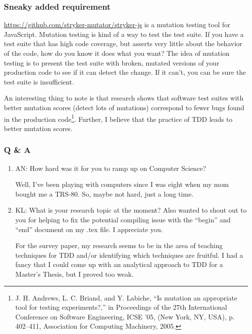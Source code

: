 \subsubsection{Sneaky added requirement}
\url{https://github.com/stryker-mutator/stryker-js} is a mutation testing tool for JavaScript.
Mutation testing is kind of a way to test the test suite.
If you have a test suite that has high code coverage, but asserts very little about the behavior of the code, how do you know it does what you want?
The idea of mutation testing is to present the test suite with broken, mutated versions of your production code to see if it can detect the change.
If it can't, you can be sure the test suite is insufficient.

An interesting thing to note is that research shows that software test suites with better mutation scores (detect lots of mutations) correspond to fewer bugs found in the production code\footnote{J. H. Andrews, L. C. Briand, and Y. Labiche, ``Is mutation an appropriate tool for testing experiments?,'' in Proceedings of the 27th International Conference on Software Engineering, ICSE ’05, (New York, NY, USA), p. 402–411, Association for Computing Machinery, 2005.}.
Further, I believe that the practice of TDD leads to better mutation scores.

\subsubsection{Q \& A}
\begin{enumerate}
    \item AN: How hard was it for you to ramp up on Computer Science?

    Well, I've been playing with computers since I was eight when my mom bought me a TRS-80.
    So, maybe not hard, just a long time.
    
    \item KL: What is your research topic at the moment? Also wanted to shout out to you for helping to fix the potential compiling issue with the ``begin'' and ``end'' document on my .tex file. I appreciate you.

    For the survey paper, my research seems to be in the area of teaching techniques for TDD and/or identifying which techniques are fruitful.
    I had a fancy that I could come up with an analytical approach to TDD for a Master's Thesis, but I proved too weak.
\end{enumerate}
